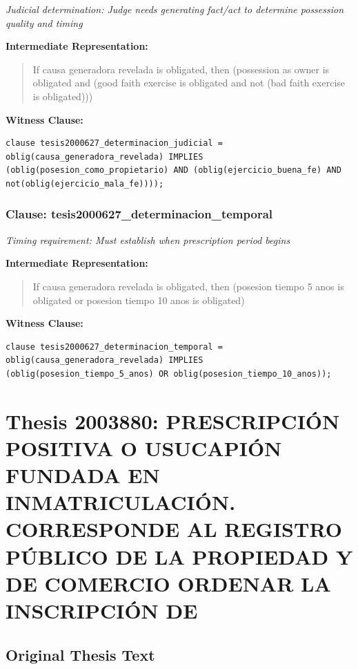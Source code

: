\documentclass[11pt,a4paper]{article}
\begin{document}
\textit{Judicial determination: Judge needs generating fact/act to determine possession quality and timing}

\textbf{Intermediate Representation:}

\begin{quote}
If causa generadora revelada is obligated, then (possession as owner is obligated and (good faith exercise is obligated and not (bad faith exercise is obligated)))
\end{quote}

\textbf{Witness Clause:}

\begin{lstlisting}[style=witnessstyle, language=Witness]
clause tesis2000627_determinacion_judicial = oblig(causa_generadora_revelada) IMPLIES (oblig(posesion_como_propietario) AND (oblig(ejercicio_buena_fe) AND not(oblig(ejercicio_mala_fe))));
\end{lstlisting}

\subsubsection{Clause: tesis2000627\_determinacion\_temporal}

\textit{Timing requirement: Must establish when prescription period begins}

\textbf{Intermediate Representation:}

\begin{quote}
If causa generadora revelada is obligated, then (posesion tiempo 5 anos is obligated or posesion tiempo 10 anos is obligated)
\end{quote}

\textbf{Witness Clause:}

\begin{lstlisting}[style=witnessstyle, language=Witness]
clause tesis2000627_determinacion_temporal = oblig(causa_generadora_revelada) IMPLIES (oblig(posesion_tiempo_5_anos) OR oblig(posesion_tiempo_10_anos));
\end{lstlisting}

\newpage

\section{Thesis 2003880: PRESCRIPCIÓN POSITIVA O USUCAPIÓN FUNDADA EN INMATRICULACIÓN. CORRESPONDE AL REGISTRO PÚBLICO DE LA PROPIEDAD Y DE COMERCIO ORDENAR LA INSCRIPCIÓN DE}
\label{thesis:2003880}

\subsection{Original Thesis Text}
\end{document}

